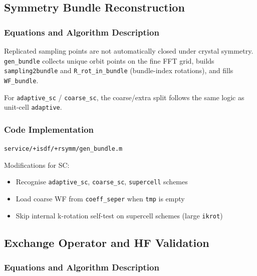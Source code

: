 \documentclass[11pt,a4paper]{article}
\begin{document}
\subsection{Symmetry Bundle Reconstruction}

\subsubsection{Equations and Algorithm Description}

Replicated sampling points are not automatically closed under crystal
symmetry. \texttt{gen\_bundle} collects unique orbit points on the fine FFT
grid, builds \texttt{sampling2bundle} and \texttt{R\_rot\_in\_bundle}
(bundle-index rotations), and fills \texttt{WF\_bundle}.

For \texttt{adaptive\_sc} / \texttt{coarse\_sc}, the coarse/extra split follows
the same logic as unit-cell \texttt{adaptive}.

\subsubsection{Code Implementation}

\texttt{service/+isdf/+rsymm/gen\_bundle.m}

Modifications for SC:
\begin{itemize}
  \item Recognise \texttt{adaptive\_sc}, \texttt{coarse\_sc}, \texttt{supercell} schemes
  \item Load coarse WF from \texttt{coeff\_seper} when \texttt{tmp} is empty
  \item Skip internal k-rotation self-test on supercell schemes (large \texttt{ikrot})
\end{itemize}

\subsection{Exchange Operator and HF Validation}

\subsubsection{Equations and Algorithm Description}
\end{document}
